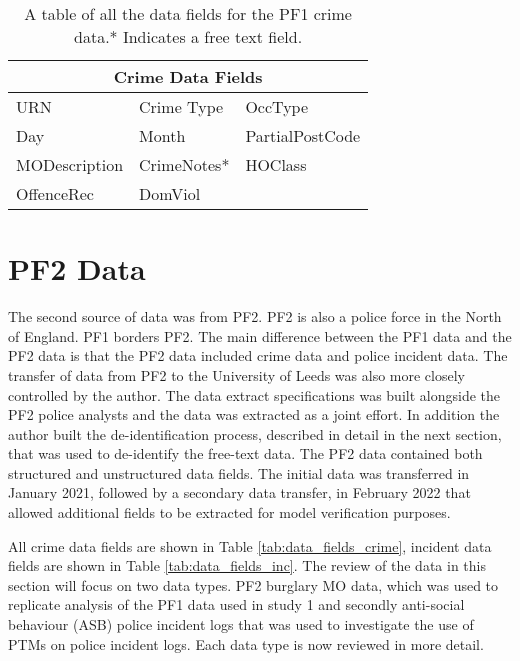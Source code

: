 \begin{table}[]
\centering
\begin{tabular}{@{}lll@{}}
\toprule
\multicolumn{3}{c}{Crime Data Fields}                          \\ \midrule
URN & Crime Type       & OccType      \\
Day           & Month          & PartialPostCode                \\
MODescription & CrimeNotes*             & HOClass            \\
OffenceRec  &  DomViol          &           \\ \bottomrule
\end{tabular}
\caption[Table of data fields for the PF1 data]{\label{tab:data_fields_PF1} A table of all the data fields for the PF1 crime data.* Indicates a free text field.}
\end{table}


\section{PF2 Data} The second source of data was from PF2. PF2 is also a police force in the North of England. PF1 borders PF2. The main difference between the PF1 data and the PF2 data is that the PF2 data included crime data and police incident data. The transfer of data from PF2 to the University of Leeds was also more closely controlled by the author. The data extract specifications was built alongside the PF2 police analysts and the data was extracted as a joint effort. In addition the author built the de-identification process, described in detail in the next section, that was used to de-identify the free-text data. The PF2 data contained both structured and unstructured data fields. The initial data was transferred in January 2021, followed by a secondary data transfer, in February 2022 that allowed additional fields to be extracted for model verification purposes. 

All crime data fields are shown in Table \ref{tab:data_fields_crime}, incident data fields are shown in Table \ref{tab:data_fields_inc}. The review of the data in this section will focus on two data types. PF2 burglary MO data, which was used to replicate analysis of the PF1 data used in study 1 and secondly anti-social behaviour (ASB) police incident logs that was used to investigate the use of PTMs on police incident logs. Each data type is now reviewed in more detail.




